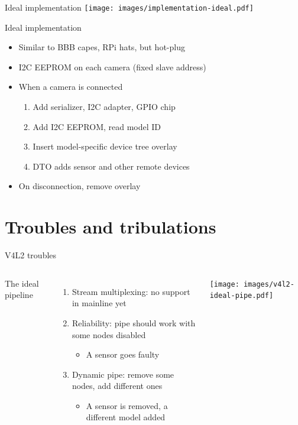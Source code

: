 \documentclass[xetex,table,aspectratio=169]{beamer}
\begin{document}
\begin{frame}{Ideal implementation}
  \center\texttt{[image: images/implementation-ideal.pdf]}
\end{frame}

\begin{frame}{Ideal implementation}
  \begin{itemize}
  \item Similar to BBB capes, RPi hats, but hot-plug
  \item I2C EEPROM on each camera (fixed slave address)
  \item When a camera is connected
    \begin{enumerate}
    \item Add serializer, I2C adapter, GPIO chip
    \item Add I2C EEPROM, read model ID
    \item Insert model-specific device tree overlay
    \item DTO adds sensor and other remote devices
    \end{enumerate}
  \item On disconnection, remove overlay
  \end{itemize}
\end{frame}


\section{Troubles and tribulations}

\begin{frame}{V4L2 troubles}
  \begin{columns}
    \begin{flushright}
      The ideal pipeline \textrightarrow
    \end{flushright}

    \vspace{0.2\textheight}

    \begin{enumerate}
    \item Stream multiplexing: no support in mainline yet
    \item Reliability: pipe should work with some nodes disabled
      \begin{itemize}
      \item A sensor goes faulty
      \end{itemize}
    \item Dynamic pipe: remove some nodes, add different ones
      \begin{itemize}
      \item A sensor is removed, a different model added
      \end{itemize}
    \end{enumerate}

    \center\texttt{[image: images/v4l2-ideal-pipe.pdf]}
  \end{columns}
\end{frame}
\end{document}
